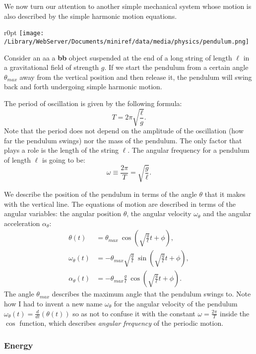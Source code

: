 \documentclass[letterpaper,9pt,journal]{IEEEtran}
\newcommand{\dokuitalic}[1]{\textsl{#1}}
\begin{document}
We now turn our attention to another simple mechanical system whose
motion is also described by the simple harmonic motion equations. 

\begin{wrapfigure}{r}{0pt}
\texttt{[image: /Library/WebServer/Documents/miniref/data/media/physics/pendulum.png]}
\end{wrapfigure}

Consider an {aa a \bf bb} object suspended at the end of a long string of length $\ell$ in a gravitational field of strength $g$.
If we start the pendulum from a certain angle $\theta_{max}$ away from the vertical position and then release it,
the pendulum will swing back and forth undergoing simple harmonic motion.

The period of oscillation is given by the following formula:
\[
 T = 2\pi \sqrt{ \frac{\ell}{g} }.
\]
Note that the period does not depend on the amplitude of the oscillation (how far the pendulum swings)
nor the mass of the pendulum. The only factor that plays a role is the length of the string $\ell$.
The angular frequency for a pendulum of length $\ell$ is going to be:
\[
 \omega \equiv \frac{2\pi}{T} = \sqrt{ \frac{g}{\ell} }.
\]

We describe the position of the pendulum in terms of the angle $\theta$ that it makes with
the vertical line. The equations of motion are described in terms of the angular variables: 
the angular position $\theta$, the angular velocity $\omega_\theta$ and the angular acceleration 
$\alpha_\theta$:
\begin{align*}
\theta(t) 	 	&= \theta_{max}	\:	\cos\!\left( \sqrt{ \frac{g}{\ell} } t + \phi\right), \\
\omega_\theta(t) 	&= -\theta_{max}\sqrt{ \frac{g}{\ell} } \:  \sin\!\left( \sqrt{ \frac{g}{\ell} } t + \phi\right), \\
\alpha_\theta(t) 	&= -\theta_{max}\frac{g}{\ell} \: \cos\!\left( \sqrt{ \frac{g}{\ell} } t + \phi\right).
\end{align*}
The angle $\theta_{max}$ describes the maximum angle that the pendulum swings to.
Note how I had to invent a new name $\omega_\theta$ for the angular velocity
of the pendulum $\omega_\theta(t)=\frac{d}{dt}\!\left(\theta(t)\right)$ so 
as not to confuse it with the constant $\omega=\frac{2\pi}{T}$ inside the $\cos$ function,
which  describes \dokuitalic{angular frequency} of the periodic motion.


\subsubsection{Energy}
\end{document}
